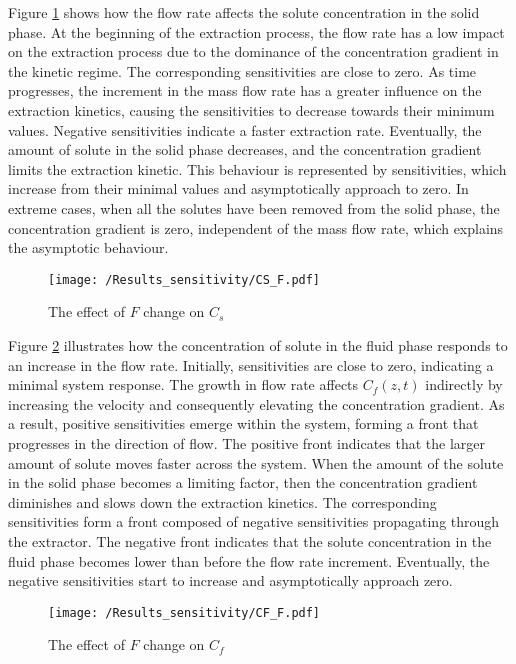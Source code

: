 \documentclass[../Article_Design_of_Experiment.tex]{subfiles}
\begin{document}
   Figure \ref{fig:Sensitivty_F_CS} shows how the flow rate affects the solute concentration in the solid phase. At the beginning of the extraction process, the flow rate has a low impact on the extraction process due to the dominance of the concentration gradient in the kinetic regime. The corresponding sensitivities are close to zero. As time progresses, the increment in the mass flow rate has a greater influence on the extraction kinetics, causing the sensitivities to decrease towards their minimum values. Negative sensitivities indicate a faster extraction rate. Eventually, the amount of solute in the solid phase decreases, and the concentration gradient limits the extraction kinetic. This behaviour is represented by sensitivities, which increase from their minimal values and asymptotically approach to zero. In extreme cases, when all the solutes have been removed from the solid phase, the concentration gradient is zero, independent of the mass flow rate, which explains the asymptotic behaviour.
    
    \begin{figure}[h!]
    	\centering
    	\texttt{[image: /Results\_sensitivity/CS\_F.pdf]}
    	\caption{The effect of $F$ change on $C_s$}
    	\label{fig:Sensitivty_F_CS}
    \end{figure}
    
    Figure \ref{fig:Sensitivty_F_CF} illustrates how the concentration of solute in the fluid phase responds to an increase in the flow rate. Initially, sensitivities are close to zero, indicating a minimal system response. The growth in flow rate affects $C_f(z,t)$ indirectly by increasing the velocity and consequently elevating the concentration gradient. As a result, positive sensitivities emerge within the system, forming a front that progresses in the direction of flow. The positive front indicates that the larger amount of solute moves faster across the system. When the amount of the solute in the solid phase becomes a limiting factor, then the concentration gradient diminishes and slows down the extraction kinetics. The corresponding sensitivities form a front composed of negative sensitivities propagating through the extractor. The negative front indicates that the solute concentration in the fluid phase becomes lower than before the flow rate increment. Eventually, the negative sensitivities start to increase and asymptotically approach zero.
    
    \begin{figure}[h!]
    	\centering
    	\texttt{[image: /Results\_sensitivity/CF\_F.pdf]}
    	\caption{The effect of $F$ change on $C_f$}
    	\label{fig:Sensitivty_F_CF}
    \end{figure}
\end{document}
